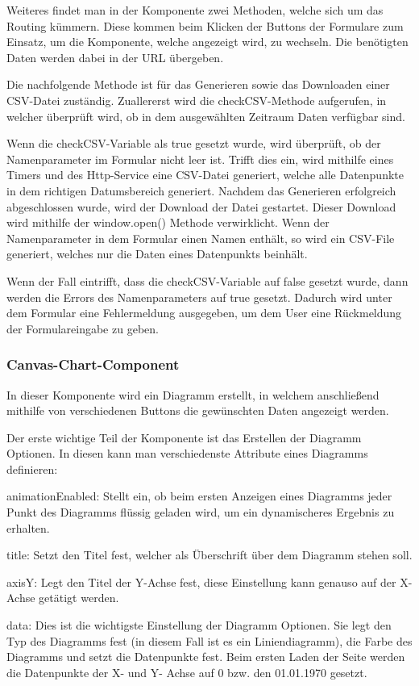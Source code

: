 Weiteres findet man in der Komponente zwei Methoden, welche sich um das Routing kümmern. Diese kommen beim Klicken der Buttons der Formulare zum Einsatz, um die Komponente, welche angezeigt wird, zu wechseln. Die benötigten Daten werden dabei in der URL übergeben.

Die nachfolgende Methode ist für das Generieren sowie das Downloaden einer CSV-Datei zuständig. Zuallererst wird die checkCSV-Methode aufgerufen, in welcher überprüft wird, ob in dem ausgewählten Zeitraum Daten verfügbar sind.

Wenn die checkCSV-Variable als true gesetzt wurde, wird überprüft, ob der Namenparameter im Formular nicht leer ist. Trifft dies ein, wird mithilfe eines Timers und des Http-Service eine CSV-Datei generiert, welche alle Datenpunkte in dem richtigen Datumsbereich generiert. Nachdem das Generieren erfolgreich abgeschlossen wurde, wird der Download der Datei gestartet. Dieser Download wird mithilfe der window.open() Methode verwirklicht. Wenn der Namenparameter in dem Formular einen Namen enthält, so wird ein CSV-File generiert, welches nur die Daten eines Datenpunkts beinhält.

Wenn der Fall eintrifft, dass die checkCSV-Variable auf false gesetzt wurde, dann werden die Errors des Namenparameters auf true gesetzt. Dadurch wird unter dem Formular eine Fehlermeldung ausgegeben, um dem User eine Rückmeldung der Formulareingabe zu geben.

\subsubsection{Canvas-Chart-Component}

In dieser Komponente wird ein Diagramm erstellt, in welchem anschließend mithilfe von verschiedenen Buttons die gewünschten Daten angezeigt werden.  

Der erste wichtige Teil der Komponente ist das Erstellen der Diagramm Optionen. In diesen kann man verschiedenste Attribute eines Diagramms definieren: 

\begin{compactitem}
    \item animationEnabled: Stellt ein, ob beim ersten Anzeigen eines Diagramms jeder Punkt des Diagramms flüssig geladen wird, um ein dynamischeres Ergebnis zu erhalten.    
    \item title: Setzt den Titel fest, welcher als Überschrift über dem Diagramm stehen soll.          
    \item axisY: Legt den Titel der Y-Achse fest, diese Einstellung kann genauso auf der X-Achse getätigt werden.    
    \item data: Dies ist die wichtigste Einstellung der Diagramm Optionen. Sie legt den Typ des Diagramms fest (in diesem Fall ist es ein Liniendiagramm), die Farbe des Diagramms und setzt die Datenpunkte fest. Beim ersten Laden der Seite werden die Datenpunkte der X- und Y- Achse auf 0 bzw. den 01.01.1970 gesetzt. 
\end{compactitem}

